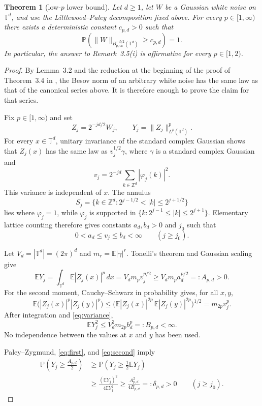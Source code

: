 \documentclass[11pt]{article}
\newtheorem{theorem}{Theorem}
\newcommand{\T}{\mathbb T}
\newcommand{\Z}{\mathbb Z}
\newcommand{\E}{\mathbb E}
\newcommand{\Pp}{\mathbb P}
\begin{document}
\begin{theorem}[low-$p$ lower bound]\label{thm:main}
Let $d\ge1$, let $W$ be a Gaussian white noise on $\T^d$, and use the
Littlewood--Paley decomposition fixed above.  For every
$p\in[1,\infty)$ there exists a deterministic constant $c_{p,d}>0$ such that
\[
 \Pp\!\left(\|W\|_{B^{-d/2}_{p,\infty}(\T^d)}\ge c_{p,d}\right)=1.
\]
In particular, the answer to Remark~3.5(i) is affirmative for every
$p\in[1,2)$.
\end{theorem}

\begin{proof}
By Lemma~3.2 and the reduction at the beginning of the proof of Theorem~3.4
in \cite{Veraar}, the Besov norm of an arbitrary white noise has the same law
as that of the canonical series above.  It is therefore enough to prove the
claim for that series.

Fix $p\in[1,\infty)$ and set
\[
 Z_j=2^{-jd/2}W_j,
 \qquad
 Y_j=\|Z_j\|_{L^p(\T^d)}^p.
\]
For every $x\in\T^d$, unitary invariance of the standard complex Gaussian
shows that $Z_j(x)$ has the same law as $v_j^{1/2}\gamma$, where $\gamma$ is
a standard complex Gaussian and
\[
 v_j=2^{-jd}\sum_{k\in\Z^d}|\varphi_j(k)|^2.
\]
This variance is independent of $x$.  The annulus
\[
 S_j=\{k\in\Z^d:2^{j-1/2}<|k|\le2^{j+1/2}\}
\]
lies where $\varphi_j=1$, while $\varphi_j$ is supported in
$\{k:2^{j-1}\le|k|\le2^{j+1}\}$.  Elementary lattice counting therefore
gives constants $a_d,b_d>0$ and $j_0$ such that
\begin{equation}\label{eq:variance}
 0<a_d\le v_j\le b_d<\infty \qquad (j\ge j_0).
\end{equation}

Let $V_d=|\T^d|=(2\pi)^d$ and $m_r=\E|\gamma|^r$.  Tonelli's theorem and
Gaussian scaling give
\begin{equation}\label{eq:first}
 \E Y_j
 =\int_{\T^d}\E|Z_j(x)|^p\,dx
 =V_d m_p v_j^{p/2}
 \ge V_dm_pa_d^{p/2}=:A_{p,d}>0.
\end{equation}
For the second moment, Cauchy--Schwarz in probability gives, for all $x,y$,
\[
 \E\bigl(|Z_j(x)|^p|Z_j(y)|^p\bigr)
 \le \bigl(\E|Z_j(x)|^{2p}\,\E|Z_j(y)|^{2p}\bigr)^{1/2}
 =m_{2p}v_j^p.
\]
After integration and \eqref{eq:variance},
\begin{equation}\label{eq:second}
 \E Y_j^2\le V_d^2m_{2p}b_d^p=:B_{p,d}<\infty.
\end{equation}
No independence between the values at $x$ and $y$ has been used.

Paley--Zygmund, \eqref{eq:first}, and \eqref{eq:second} imply
\begin{align*}
 \Pp\!\left(Y_j\ge\frac{A_{p,d}}2\right)
 &\ge \Pp\!\left(Y_j\ge\frac12\E Y_j\right) \\
 &\ge \frac{(\E Y_j)^2}{4\E Y_j^2}
 \ge \frac{A_{p,d}^2}{4B_{p,d}}=:\delta_{p,d}>0
 \qquad(j\ge j_0).
\end{align*}


\end{proof}
\end{document}
